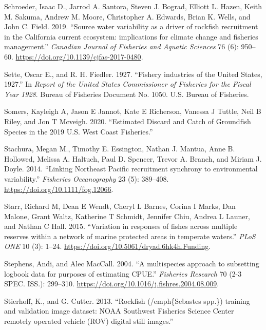 \documentclass[
  english,
  a4paper,
]{article}
\newlength{\cslhangindent}
\newlength{\cslentryspacingunit} %
\newenvironment{CSLReferences}[2] %
 {%
  \setlength{\parindent}{0pt}
  \ifodd #1
  \let\oldpar\par
  \def\par{\hangindent=\cslhangindent\oldpar}
  \fi
  \setlength{\parskip}{#2\cslentryspacingunit}
 }%
 {}
\begin{document}
\begin{CSLReferences}{1}{0}
\leavevmode{}%
Schroeder, Isaac D., Jarrod A. Santora, Steven J. Bograd, Elliott L. Hazen, Keith M. Sakuma, Andrew M. Moore, Christopher A. Edwards, Brian K. Wells, and John C. Field. 2019. {``{Source water variability as a driver of rockfish recruitment in the California current ecosystem: implications for climate change and fisheries management}.''} \emph{Canadian Journal of Fisheries and Aquatic Sciences} 76 (6): 950--60. \url{https://doi.org/10.1139/cjfas-2017-0480}.

\leavevmode{}%
Sette, Oscar E., and R. H. Fiedler. 1927. {``{Fishery industries of the United States, 1927}.''} In \emph{Report of the United States Commissioner of Fisheries for the Fiscal Year 1928}. Bureau of Fisheries Document No. 1050. U.S. Bureau of Fisheries.

\leavevmode{}%
Somers, Kayleigh A, Jason E Jannot, Kate E Richerson, Vanessa J Tuttle, Neil B Riley, and Jon T Mcveigh. 2020. {``{Estimated Discard and Catch of Groundfish Species in the 2019 U.S. West Coast Fisheries}.''}

\leavevmode{}%
Stachura, Megan M., Timothy E. Essington, Nathan J. Mantua, Anne B. Hollowed, Melissa A. Haltuch, Paul D. Spencer, Trevor A. Branch, and Miriam J. Doyle. 2014. {``{Linking Northeast Pacific recruitment synchrony to environmental variability}.''} \emph{Fisheries Oceanography} 23 (5): 389--408. \url{https://doi.org/10.1111/fog.12066}.

\leavevmode{}%
Starr, Richard M, Dean E Wendt, Cheryl L Barnes, Corina I Marks, Dan Malone, Grant Waltz, Katherine T Schmidt, Jennifer Chiu, Andrea L Launer, and Nathan C Hall. 2015. {``{Variation in responses of fishes across multiple reserves within a network of marine protected areas in temperate waters}.''} \emph{PLoS ONE} 10 (3): 1--24. \url{https://doi.org/10.5061/dryad.6hk4h.Funding}.

\leavevmode{}%
Stephens, Andi, and Alec MacCall. 2004. {``{A multispecies approach to subsetting logbook data for purposes of estimating CPUE}.''} \emph{Fisheries Research} 70 (2-3 SPEC. ISS.): 299--310. \url{https://doi.org/10.1016/j.fishres.2004.08.009}.

\leavevmode{}%
Stierhoff, K., and G. Cutter. 2013. {``{Rockfish (/emph{\{}Sebastes spp.{\}}) training and validation image dataset: NOAA Southwest Fisheries Science Center remotely operated vehicle (ROV) digital still images.}''}


\end{CSLReferences}
\end{document}
